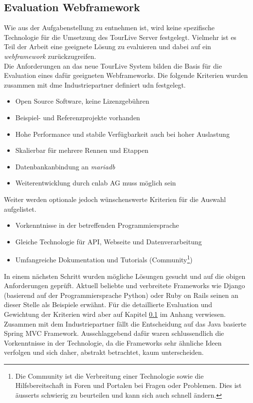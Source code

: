 \subsection{Evaluation Webframework}
\label{sec:evaluationwebframework}
Wie aus der Aufgabenstellung zu entnehmen ist, wird keine spezifische Technologie für die Umsetzung des TourLive Server festgelegt. Vielmehr ist es Teil der Arbeit eine geeignete Lösung zu evaluieren und dabei auf ein \textit{\gls{webframework}} zurückzugreifen.\\
Die Anforderungen an das neue TourLive System bilden die Basis für die Evaluation eines dafür geeigneten Webframeworks. Die folgende Kriterien wurden zusammen mit dme Industriepartner definiert udn festgelegt.
\begin{itemize}
\item Open Source Software, keine Lizenzgebühren
\item Beispiel- und Referenzprojekte vorhanden
\item Hohe Performance und stabile Verfügbarkeit auch bei hoher Auslastung
\item Skalierbar für mehrere Rennen und Etappen
\item Datenbankanbindung an \textit{\gls{mariadb}}
\item Weiterentwicklung durch cnlab AG muss möglich sein
\end{itemize}

Weiter werden optionale jedoch wünschenswerte Kriterien für die Auswahl aufgelistet.
\begin{itemize}
\item Vorkenntnisse in der betreffenden Programmiersprache
\item Gleiche Technologie für API, Webseite und Datenverarbeitung
\item Umfangreiche Dokumentation und Tutorials (Community\footnote{Die Community ist die Verbreitung einer Technologie sowie die Hilfsbereitschaft in Foren und Portalen bei Fragen oder Problemen. Dies ist äusserts schwierig zu beurteilen und kann sich auch schnell ändern.})
\end{itemize}

In einem nächsten Schritt wurden mögliche Lösungen gesucht und auf die obigen Anforderungen geprüft. Aktuell beliebte und verbreitete Frameworks wie Django (basierend auf der Programmiersprache Python) oder Ruby on Rails seinen an dieser Stelle als Beispiele erwähnt. Für die detaillierte Evaluation und Gewichtung der Kriterien wird aber auf Kapitel \ref{sec:evaluationwebframework} im Anhang verwiesen.
\\
Zusammen mit dem Industriepartner fällt die Entscheidung auf das Java basierte Spring MVC Framework. Ausschlaggebend dafür waren schlussendlich die Vorkenntnisse in der Technologie, da die Frameworks sehr ähnliche Ideen verfolgen und sich daher, abstrakt betrachtet, kaum unterscheiden.

